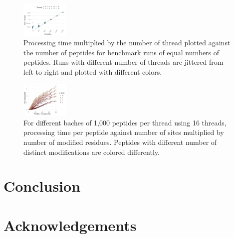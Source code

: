 \documentclass{bioinfo}
\begin{document}
\begin{figure}[!tpb]
	\centerline{\includegraphics[width=0.2\textwidth]{figures/benchmark_29.12.22_threads.png}}
	\caption{Processing time multiplied by the number of thread plotted against the number of peptides for benchmark runs of equal numbers of peptides. Runs with different number of threads are jittered from left to right and plotted with different colors.}\label{fig:performance_threads}
\end{figure}


\begin{figure}[!tpb]
\centerline{\includegraphics[width=0.2\textwidth]{figures/benchmark_29.12.22_size.png}}
\caption{For different baches of 1,000 peptides per thread using 16 threads, processing time per peptide against number of sites multiplied by number of modified residues. Peptides with different number of distinct modifications are colored differently.}\label{fig:performance_size}
\end{figure}


\section{Conclusion}







\section*{Acknowledgements}
\end{document}
